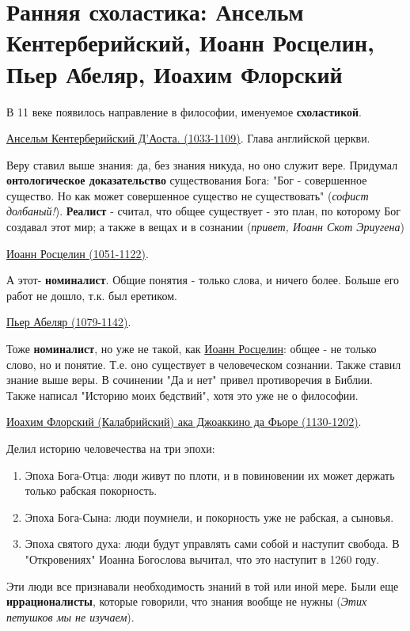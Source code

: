 \documentclass[12pt,a4paper]{article}
\begin{document}
\section{Ранняя схоластика: Ансельм Кентерберийский, Иоанн Росцелин, Пьер Абеляр, Иоахим Флорский}
В 11 веке появилось направление в философии, именуемое \textbf{схоластикой}. 

\underline{Ансельм Кентерберийский Д'Аоста. (1033-1109)}. Глава английской церкви.

Веру ставил выше знания: да, без знания никуда, но оно служит вере. Придумал \textbf{онтологическое доказательство} существования Бога: "Бог - совершенное существо. Но как может совершенное существо не существовать" (\textit{софист долбаный!}). \textbf{Реалист} - считал, что общее существует  - это план, по которому Бог создавал этот мир; а также в вещах и в сознании (\textit{привет, Иоанн Скот Эриугена})


\underline{Иоанн Росцелин (1051-1122)}. 

А этот- \textbf{номиналист}. Общие понятия - только слова, и ничего более. 
Больше его работ не дошло, т.к. был еретиком.

\underline{Пьер Абеляр (1079-1142)}. 

Тоже \textbf{номиналист}, но уже не такой, как \underline{Иоанн Росцелин}: общее - не только слово, но и понятие. Т.е. оно существует в человеческом сознании. Также ставил знание выше веры. В сочинении "Да и нет" привел противоречия в Библии. Также написал "Историю моих бедствий", хотя это уже не о философии.

\underline{Иоахим Флорский (Калабрийский) ака Джоаккино да Фьоре  (1130-1202)}. 

Делил историю человечества на три эпохи:
\begin{enumerate}
\item Эпоха Бога-Отца: люди живут по плоти, и в повиновении их может держать только рабская покорность.
\item Эпоха Бога-Сына: люди поумнели, и покорность уже не рабская, а сыновья.
\item Эпоха святого духа: люди будут управлять сами собой и наступит свобода. В "Откровениях" Иоанна Богослова вычитал, что это наступит в 1260 году. 
\end{enumerate}

Эти люди все признавали необходимость знаний в той или иной мере. Были еще \textbf{иррационалисты}, которые говорили, что знания вообще не нужны (\textit{Этих петушков мы не изучаем}).
\end{document}
